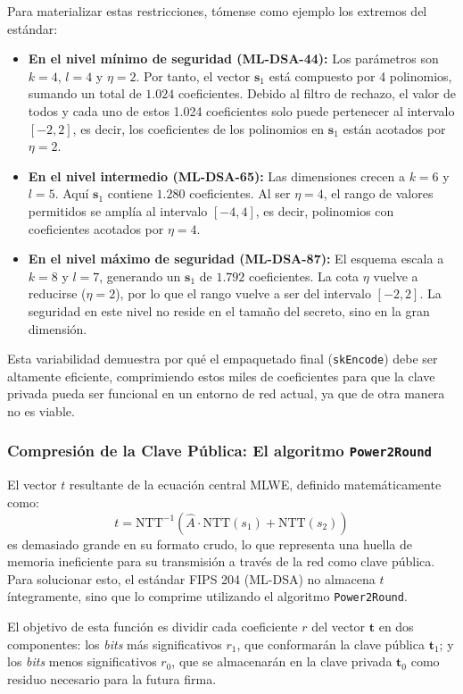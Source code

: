 \documentclass[11pt, a4paper]{report}
\theoremstyle{definition}
\begin{document}
Para materializar estas restricciones, tómense como ejemplo los extremos del estándar:
\begin{itemize}
    \item \textbf{En el nivel mínimo de seguridad (ML-DSA-44):} Los parámetros son $k=4$, $l=4$ y $\eta=2$. Por tanto, el vector $\mathbf{s}_1$ está compuesto por 4 polinomios, sumando un total de $1.024$ coeficientes. Debido al filtro de rechazo, el valor de todos y cada uno de estos 1.024 coeficientes solo puede pertenecer al intervalo $[-2, 2]$, es decir, los coeficientes de los polinomios en $\mathbf{s}_1$ están acotados por $\eta = 2$.
    \item \textbf{En el nivel intermedio (ML-DSA-65):} Las dimensiones crecen a $k=6$ y $l=5$. Aquí $\mathbf{s}_1$ contiene $1.280$ coeficientes. Al ser $\eta=4$, el rango de valores permitidos se amplía al intervalo $[-4, 4]$, es decir, polinomios con coeficientes acotados por $\eta = 4$.
    \item \textbf{En el nivel máximo de seguridad (ML-DSA-87):} El esquema escala a $k=8$ y $l=7$, generando un $\mathbf{s}_1$ de $1.792$ coeficientes. La cota $\eta$ vuelve a reducirse ($\eta=2$), por lo que el rango vuelve a ser del intervalo $[-2, 2]$. La seguridad en este nivel no reside en el tamaño del secreto, sino en la gran dimensión.
\end{itemize}

Esta variabilidad demuestra por qué el empaquetado final (\texttt{skEncode}) debe ser altamente eficiente, comprimiendo estos miles de coeficientes para que la clave privada pueda ser funcional en un entorno de red actual, ya que de otra manera no es viable.

\subsubsection{Compresión de la Clave Pública: El algoritmo \texttt{Power2Round}}

El vector $t$ resultante de la ecuación central MLWE, definido matemáticamente como:
$$t = \text{NTT}^{-1}(\hat{A} \cdot \text{NTT}(s_1) + \text{NTT}(s_2))$$
es demasiado grande en su formato crudo, lo que representa una huella de memoria ineficiente para su transmisión a través de la red como clave pública. Para solucionar esto, el estándar FIPS 204 (ML-DSA) no almacena $t$ íntegramente, sino que lo comprime utilizando el algoritmo \texttt{Power2Round}.

El objetivo de esta función es dividir cada coeficiente $r$ del vector $\mathbf{t}$ en dos componentes: los \textit{bits} más significativos $r_1$, que conformarán la clave pública $\mathbf{t}_1$; y los \textit{bits} menos significativos $r_0$, que se almacenarán en la clave privada $\mathbf{t}_0$ como residuo necesario para la futura firma.
\end{document}
